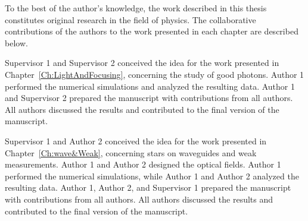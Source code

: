 To the best of the author's knowledge, the work described in this thesis constitutes original research in the field of physics. The collaborative contributions of the authors to the work presented in each chapter are described below.

Supervisor 1 and Supervisor 2 conceived the idea for the work presented in Chapter~\ref{Ch:LightAndFocusing}, concerning the study of good photons. Author 1 performed the numerical simulations and analyzed the resulting data. Author 1 and Supervisor 2 prepared the manuscript with contributions from all authors. All authors discussed the results and contributed to the final version of the manuscript.

Supervisor 1 and Author 2 conceived the idea for the work presented in Chapter~\ref{Ch:wave&Weak}, concerning stars on waveguides and weak measurements. Author 1 and Author 2 designed the optical fields. Author 1 performed the numerical simulations, while Author 1 and Author 2 analyzed the resulting data. Author 1, Author 2, and Supervisor 1 prepared the manuscript with contributions from all authors. All authors discussed the results and contributed to the final version of the manuscript.
